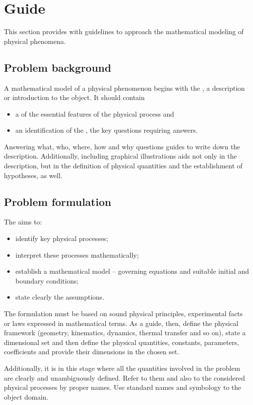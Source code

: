 \section{Guide}
This section provides with guidelines to approach the mathematical modeling of physical phenomena.


\subsection{Problem background}
A mathematical model of a physical phenomenon begins with the , a description or introduction to the object. It should contain 
\begin{itemize}
\item a  of the essential features of the physical process and 
\item an identification of the , the key questions requiring answers.
\end{itemize}

Answering what, who, where, how and why questions guides to write down the description. Additionally, including graphical illustrations aids not only in the description, but in the definition of physical quantities and the establishment of hypotheses, as well.


\subsection{Problem formulation}
The  aims to:
\begin{itemize}
\item identify key physical processes;
\item interpret these processes mathematically;
\item establish a mathematical model -- governing equations and suitable initial and boundary conditions;
\item state clearly the assumptions.
\end{itemize}

The formulation must be based on sound physical principles, experimental facts or laws expressed in mathematical terms. As a guide, then, define the physical framework (geometry, kinematics, dynamics, thermal transfer and so on), state a dimensional set and then define the physical quantities, constants, parameters, coefficients and provide their dimensions in the chosen set.

Additionally, it is in this stage where all the quantities involved in the problem are clearly and unambiguously defined. Refer to them and also to the considered physical processes by proper names. Use standard names and symbology to the object domain.

